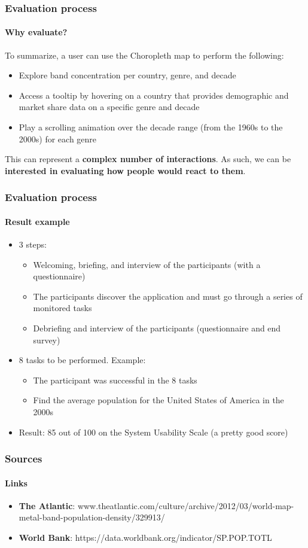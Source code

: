 \documentclass[aspectratio=43,10pt]{beamer}
\begin{document}
\begin{frame}
    \frametitle{Evaluation process}
    \framesubtitle{Why evaluate?}
    To summarize, a user can use the Choropleth map to perform the following:
    \begin{itemize}
        \item Explore band concentration per country, genre, and decade
        \item Access a tooltip by hovering on a country that provides demographic and market share data on a specific genre and decade
        \item Play a scrolling animation over the decade range (from the 1960s to the 2000s) for each genre
    \end{itemize}
    This can represent a \textbf{complex number of interactions}. As such, we can be \textbf{interested in evaluating how people would react to them}.
\end{frame}

\begin{frame}
    \frametitle{Evaluation process}
    \framesubtitle{Result example}
    \begin{itemize}
        \item 3 steps:
        \begin{itemize}
        \item Welcoming, briefing, and interview of the participants (with a questionnaire)
        \item The participants discover the application and must go through a series of monitored tasks
        \item Debriefing and interview of the participants (questionnaire and end survey)
        \end{itemize}
        \item 8 tasks to be performed. Example:
        \begin{itemize}
        \item The participant was successful in the 8 tasks
            \item Find the average population for the United States of America in the 2000s
        \end{itemize}
        \item Result: 85 out of 100 on the System Usability Scale (a pretty good score)
    \end{itemize}
\end{frame}

\begin{frame}
    \frametitle{Sources}
    \framesubtitle{Links}
    \begin{itemize}
        \item \textbf{The Atlantic}: www.theatlantic.com/culture/archive/2012/03/world-map-metal-band-population-density/329913/
        \item \textbf{World Bank}: https://data.worldbank.org/indicator/SP.POP.TOTL
    \end{itemize}
\end{frame}

\end{document}
